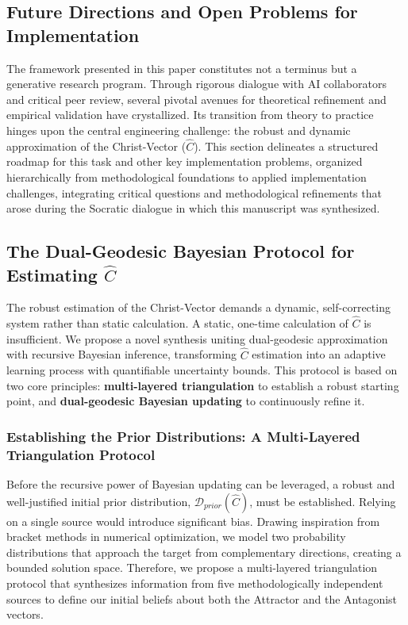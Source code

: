 \documentclass[11pt,a4paper]{article}
\theoremstyle{definition}
\theoremstyle{remark}
\begin{document}

\subsection{Future Directions and Open Problems for Implementation}

The framework presented in this paper constitutes not a terminus but a generative research program. Through rigorous dialogue with AI collaborators and critical peer review, several pivotal avenues for theoretical refinement and empirical validation have crystallized. Its transition from theory to practice hinges upon the central engineering challenge: the robust and dynamic approximation of the Christ-Vector (\(\hat{C}\)). This section delineates a structured roadmap for this task and other key implementation problems, organized hierarchically from methodological foundations to applied implementation challenges, integrating critical questions and methodological refinements that arose during the Socratic dialogue in which this manuscript was synthesized.

\subsection{The Dual-Geodesic Bayesian Protocol for Estimating \(\hat{C}\)}

The robust estimation of the Christ-Vector demands a dynamic, self-correcting system rather than static calculation. A static, one-time calculation of \(\hat{C}\) is insufficient. We propose a novel synthesis uniting dual-geodesic approximation with recursive Bayesian inference, transforming \(\hat{C}\) estimation into an adaptive learning process with quantifiable uncertainty bounds. This protocol is based on two core principles: \textbf{multi-layered triangulation} to establish a robust starting point, and \textbf{dual-geodesic Bayesian updating} to continuously refine it.

\subsubsection{Establishing the Prior Distributions: A Multi-Layered Triangulation Protocol}

Before the recursive power of Bayesian updating can be leveraged, a robust and well-justified initial prior distribution, \( \mathcal{D}_{prior}(\hat{C}) \), must be established. Relying on a single source would introduce significant bias. Drawing inspiration from bracket methods in numerical optimization, we model two probability distributions that approach the target from complementary directions, creating a bounded solution space. Therefore, we propose a multi-layered triangulation protocol that synthesizes information from five methodologically independent sources to define our initial beliefs about both the Attractor and the Antagonist vectors.
\end{document}
